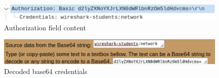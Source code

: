 \begin{figure}[htbp]
    \centering
    \includegraphics[width=1\linewidth]{img/18.png}
    \caption{Authorization field content}\label{fig:18}
\end{figure}

\begin{figure}[htbp]
    \centering
    \includegraphics[width=1\linewidth]{img/19.png}
    \caption{Decoded base64 credentials}\label{fig:19}
\end{figure}
